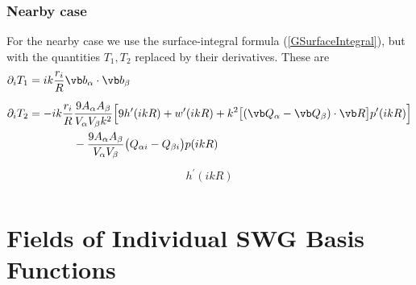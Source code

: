\documentclass[letterpaper]{article}
\begin{document}
\subsubsection*{Nearby case}
 
For the nearby case we use the surface-integral formula
(\ref{GSurfaceIntegral}), but with the quantities $T_1, T_2$ 
replaced by their derivatives. These are 
\begin{align*}
 \partial_i T_1 
&= 
 ik \frac{r_i}{R} \vb b_\alpha \cdot \vb b_\beta
\\[5pt]
 \partial_i T_2 
&= -ik\frac{r_i}{R}\frac{9A_\alpha A_\beta }{V_\alpha V_\beta k^2}
    \Big[  9h^\prime(ikR) 
          + w^\prime(ikR) 
          + k^2\big[(\vb Q_\alpha - \vb Q_\beta)\cdot \vb R\big]p^\prime(ikR)
    \Big]
\\
&\qquad \qquad 
   -\frac{9A_\alpha A_\beta}{V_\alpha V_\beta}
    \big( Q_{\alpha i}- Q_{\beta i} \big) p(ikR)
\end{align*}
\begin{align*}
 h^\prime(ikR) \\
\end{align*}

\newpage
\section{Fields of Individual SWG Basis Functions}
\end{document}
